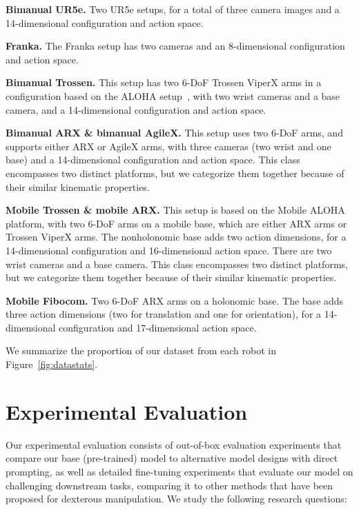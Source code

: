 \noindent \textbf{Bimanual UR5e.} Two UR5e setups, for a total of three camera images and a 14-dimensional configuration and action space.

\noindent \textbf{Franka.} The Franka setup has two cameras and an 8-dimensional configuration and action space.

\noindent \textbf{Bimanual Trossen.} This setup has two 6-DoF Trossen ViperX arms in a configuration based on the ALOHA setup~\citep{aldaco2024aloha, zhao2023learning}, with two wrist cameras and a base camera, and a 14-dimensional configuration and action space.

\noindent \textbf{Bimanual ARX \& bimanual AgileX.} This setup uses two 6-DoF arms, and supports either ARX or AgileX arms, with three cameras (two wrist and one base) and a 14-dimensional configuration and action space. This class encompasses two distinct platforms, but we categorize them together because of their similar kinematic properties.

\noindent \textbf{Mobile Trossen \& mobile ARX.} This setup is based on the Mobile ALOHA~\citep{zhao2023learning} platform, with two 6-DoF arms on a mobile base, which are either ARX arms or Trossen ViperX arms. The nonholonomic base adds two action dimensions, for a 14-dimensional configuration and 16-dimensional action space. There are two wrist cameras and a base camera. This class encompasses two distinct platforms, but we categorize them together because of their similar kinematic properties.

\noindent \textbf{Mobile Fibocom.} Two 6-DoF ARX arms on a holonomic base. The base adds three action dimensions (two for translation and one for orientation), for a 14-dimensional configuration and 17-dimensional action space.

We summarize the proportion of our dataset from each robot in Figure~\ref{fig:datastats}.

\section{Experimental Evaluation}
\label{sec:experiments}

Our experimental evaluation consists of out-of-box evaluation experiments that compare our base (pre-trained) model to alternative model designs with direct prompting, as well as detailed fine-tuning experiments that evaluate our model on challenging downstream tasks, comparing it to other methods that have been proposed for dexterous manipulation. We study the following research questions:

